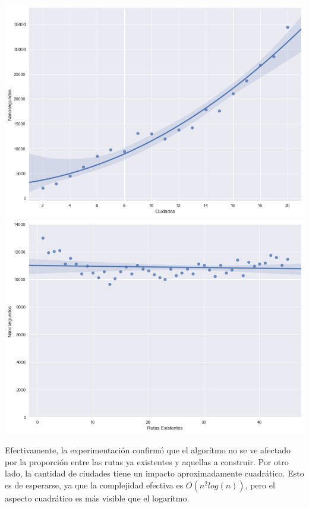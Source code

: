 \begin{center}
	\includegraphics[scale=0.5]{imagenes/ej3-1.png}
	\includegraphics[scale=0.5]{imagenes/ej3-2.png}
\end{center}

Efectivamente, la experimentación confirmó que el algorítmo no se ve afectado por la proporción entre las rutas ya existentes y aquellas a construir. Por otro lado, la cantidad de ciudades tiene un impacto aproximadamente cuadrático. Esto es de esperarse, ya que la complejidad efectiva es $O(n^2log(n))$, pero el aspecto cuadrático es más visible que el logarítmo.

\pagebreak